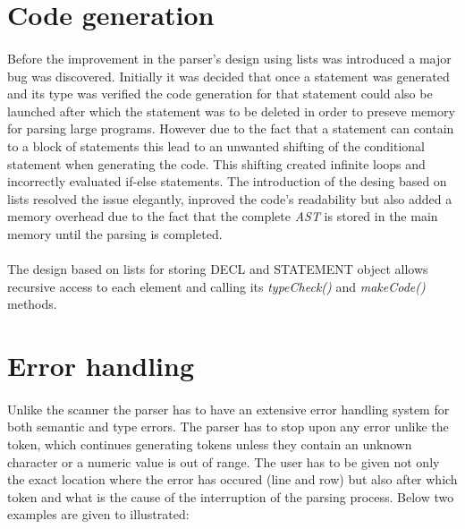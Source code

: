     	\section{Code generation}
    	\paragraph{}
    		Before the improvement in the parser's design using lists was introduced a major bug was discovered. Initially it was decided that once a statement was generated and its type was verified the code generation for that statement could also be launched after which the statement was to be deleted in order to preseve memory for parsing large programs. However due to the fact that a statement can contain to a block of statements this lead to an unwanted shifting of the conditional statement when generating the code. This shifting created infinite loops and incorrectly evaluated if-else statements. The introduction of the desing based on lists resolved the issue elegantly, inproved the code's readability but also added a memory overhead due to the fact that the complete \textit{AST} is stored in the main memory until the parsing is completed.
    	\paragraph{}
    		The design based on lists for storing DECL and STATEMENT object allows recursive access to each element and calling its \textit{typeCheck()} and \textit{makeCode()} methods.
    		
    \section{Error handling}
    \paragraph{}
    		Unlike the scanner the parser has to have an extensive error handling system for both semantic and type errors. The parser has to stop upon any error unlike the token, which continues generating tokens unless they contain an unknown character or a numeric value is out of range. The user has to be given not only the exact location where the error has occured (line and row) but also after which token and what is the cause of the interruption of the parsing process. Below two examples are given to illustrated:
    		
